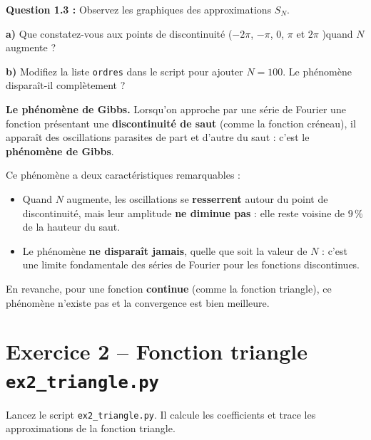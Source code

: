 \documentclass[12pt,a4paper]{article}
\newcommand{\cadreReponse}[1][4]{%
    \begin{mdframed}[
        backgroundcolor=repbg,
        linecolor=repframe,
        linewidth=1pt,
        roundcorner=4pt,
        innertopmargin=6pt,
        innerbottommargin=6pt,
    ]
    \vspace{#1\baselineskip}
    \end{mdframed}%
}
\begin{document}
\begin{exercicebox}
\textbf{Question 1.3 :} Observez les graphiques des approximations $S_N$.
\end{exercicebox}

\vfill 

\noindent\textbf{a)} Que constatez-vous aux points de discontinuité ($-2\pi$, $-\pi$, 0, $\pi$ et $2\pi$ )quand $N$ augmente ? 

\cadreReponse[3]

\vfill  


\noindent\textbf{b)} Modifiez la liste \texttt{ordres} dans le script pour ajouter $N = 100$. Le phénomène disparaît-il complètement ?

\cadreReponse[2]

\vfill  


\begin{rappelbox}
\textbf{Le phénomène de Gibbs.}
Lorsqu'on approche par une série de Fourier une fonction présentant une \textbf{discontinuité de saut} (comme la fonction créneau), il apparaît des oscillations parasites de part et d'autre du saut : c'est le \textbf{phénomène de Gibbs}.

Ce phénomène a deux caractéristiques remarquables :
\begin{itemize}
    \item Quand $N$ augmente, les oscillations se \textbf{resserrent} autour du point de discontinuité, mais leur amplitude \textbf{ne diminue pas} : elle reste voisine de $9\,\%$ de la hauteur du saut.
    \item Le phénomène \textbf{ne disparaît jamais}, quelle que soit la valeur de $N$ : c'est une limite fondamentale des séries de Fourier pour les fonctions discontinues.
\end{itemize}

En revanche, pour une fonction \textbf{continue} (comme la fonction triangle), ce phénomène n'existe pas et la convergence est bien meilleure.
\end{rappelbox}


\vfill 

\section{Exercice 2 -- Fonction triangle \hfill\normalsize\texttt{ex2\_triangle.py}}

\begin{fichierbox}
Lancez le script \texttt{ex2\_triangle.py}. Il calcule les coefficients et trace les approximations de la fonction triangle.
\end{fichierbox}
\end{document}
